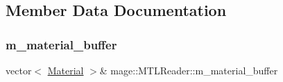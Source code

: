 \subsection{Member Data Documentation}
\hypertarget{classmage_1_1_m_t_l_reader_a6382e0e9fce6581b129d18f5d82994c2}{}\label{classmage_1_1_m_t_l_reader_a6382e0e9fce6581b129d18f5d82994c2} 
\subsubsection{\texorpdfstring{m\+\_\+material\+\_\+buffer}{m\_material\_buffer}}
{\footnotesize\ttfamily vector$<$ \hyperlink{structmage_1_1_material}{Material} $>$\& mage\+::\+M\+T\+L\+Reader\+::m\+\_\+material\+\_\+buffer\hspace{0.3cm}{\ttfamily [private]}}

